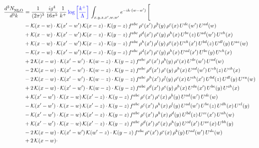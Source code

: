 \documentclass[9pt]{article}
\numberwithin{equation}{section}
\begin{document}
\begin{align}
     \frac{d^{3}N_{\rm NLO}^{\rm}}{d^{3}k}  & = \frac{1}{(2\pi)^{3}}\, \frac{ig^{4}}{16\pi^{5}}\, \frac{1}{k^{+}}\,{\color{blue}\log{\left[\frac{k^{+}}{\Lambda}\right]}}\, \int_{x,y,z,x^{\prime},w,w^{\prime}}e^{-ik\cdot (w-w')}\, \Bigg[\notag \\ & -\mathcal{K}(x-w)\cdot \mathcal{K}(x'-w')\, \mathcal{K}(x-z)\cdot \mathcal{K}(y-z)\, f^{abc}\, \rho^{e}(x')\,\rho^{b}(y)\,\rho^{c}(x)\,U^{de}(w')\,U^{ad}(w)\notag \\ & + \mathcal{K}(x-w)\cdot \mathcal{K}(x'-w')\, \mathcal{K}(x-z)\cdot \mathcal{K}(y-z)\, f^{abc}\, \rho^{d}(x')\,\rho^{e}(y)\,\rho^{h}(x)\,U^{be}(z)\,U^{ad}(w')\,U^{ch}(x)\notag \\ & + \mathcal{K}(x-w)\cdot \mathcal{K}(x'-w')\, \mathcal{K}(x-z)\cdot \mathcal{K}(y-z)\, f^{abc}\, \rho^{h}(x')\,\rho^{l}(y)\,\rho^{c}(x)\,U^{eh}(x')\,U^{bd}(z)\,U^{dl}(y)\,U^{ae}(w)\notag \\ & -\mathcal{K}(x-w)\cdot \mathcal{K}(x'-w')\, \mathcal{K}(x-z)\cdot \mathcal{K}(y-z)\, f^{abc}\, \rho^{d}(x')\,\rho^{e}(y)\,\rho^{h}(x)\,U^{ad}(x')\,U^{be}(y)\,U^{ch}(x)\notag \\ & + 2\,\mathcal{K}(x-w)\cdot \mathcal{K}(x'-w')\cdot \mathcal{K}(w-z)\cdot \mathcal{K}(y-z)\, f^{abc}\, \rho^{e}(x')\,\rho^{b}(y)\,\rho^{c}(x)\,U^{de}(w')\,U^{ad}(w)\notag \\ & - 2\,\mathcal{K}(x-w)\cdot \mathcal{K}(x'-w')\cdot \mathcal{K}(w-z)\cdot \mathcal{K}(y-z)\, f^{abc}\, \rho^{d}(x')\,\rho^{e}(y)\,\rho^{h}(x)\,U^{ad}(w')\,U^{eb}(z)\,U^{ch}(x)\notag \\ & - 2\,\mathcal{K}(x-w)\cdot \mathcal{K}(x'-w')\cdot \mathcal{K}(w-z)\cdot \mathcal{K}(y-z)\, f^{abc}\, \rho^{h}(x')\,\rho^{l}(y)\,\rho^{c}(x)\,U^{eh}(x')\,U^{bd}(z)\,U^{dl}(y)\,U^{ea}(w)\notag \\ &  + 2\,\mathcal{K}(x-w)\cdot \mathcal{K}(x'-w')\cdot \mathcal{K}(w-z)\cdot \mathcal{K}(y-z)\, f^{abc}\, \rho^{d}(x')\,\rho^{e}(y)\,\rho^{h}(x)\,U^{da}(x')\,U^{be}(y)\,U^{ch}(x)\notag \\ & + \mathcal{K}(x'-w')\cdot \mathcal{K}(x-w)\, \mathcal{K}(x'-z)\cdot \mathcal{K}(y-z)\, f^{abc}\,\rho^{c}(x')\,\rho^{e}(x)\,\rho^{b}(y)\, U^{ad}(w')\,U^{de}(w)\notag \\ & -\mathcal{K}(x'-w')\cdot \mathcal{K}(x-w)\, \mathcal{K}(x'-z)\cdot \mathcal{K}(y-z)\, f^{abc}\,\rho^{c}(x')\,\rho^{h}(x)\,\rho^{l}(y)\, U^{ad}(w')\,U^{be}(z)\,U^{dh}(x)\,U^{el}(y)\notag \\ & -\mathcal{K}(x'-w')\cdot \mathcal{K}(x-w)\, \mathcal{K}(x'-z)\cdot \mathcal{K}(y-z)\, f^{abc}\,\rho^{e}(x')\,\rho^{h}(x)\,\rho^{d}(y)\, U^{bd}(z)\,U^{ce}(x')\,U^{ah}(w)\notag \\ & +\mathcal{K}(x'-w')\cdot \mathcal{K}(x-w)\, \mathcal{K}(x'-z)\cdot \mathcal{K}(y-z)\, f^{abc}\,\rho^{d}(x')\,\rho^{e}(x)\,\rho^{h}(y)\, U^{cd}(x')\,U^{ae}(x)\,U^{bh}(y)\notag \\ & -2\, \mathcal{K}(x-w)\cdot \mathcal{K}(x'-w')\, \mathcal{K}(w'-z)\cdot \mathcal{K}(y-z)\, f^{abc}\,\rho^{c}(x')\,\rho^{e}(x)\,\rho^{b}(y)\,U^{ad}(w')\,U^{de}(w)\notag \\ & +2\, \mathcal{K}(x-w)\cdot 
\end{align}
\end{document}
